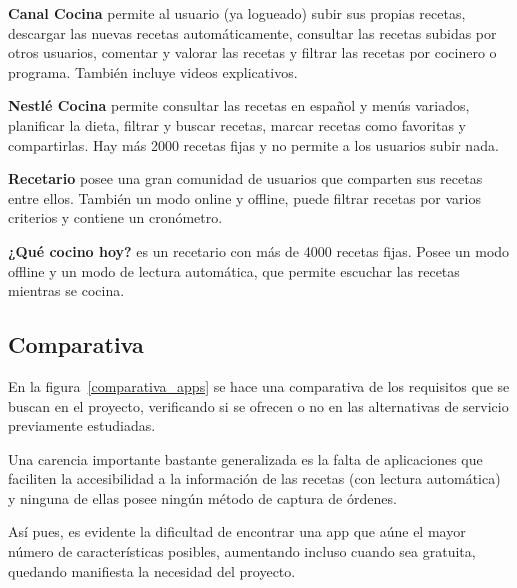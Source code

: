 \textbf{Canal Cocina} permite al usuario (ya logueado) subir sus propias
recetas, descargar las nuevas recetas automáticamente, consultar las recetas
subidas por otros usuarios, comentar y valorar las recetas y filtrar las
recetas por cocinero o programa. También incluye videos explicativos.

\textbf{Nestlé Cocina} permite consultar las recetas en español y menús variados,
planificar la dieta, filtrar y buscar recetas, marcar recetas como favoritas
y compartirlas. Hay más 2000 recetas fijas y no permite a los usuarios subir
nada.

\textbf{Recetario} posee una gran comunidad de usuarios que comparten sus
recetas entre ellos. También un modo online y offline, puede filtrar recetas
por varios criterios y contiene un cronómetro.

\textbf{¿Qué cocino hoy?} es un recetario con más de 4000 recetas fijas. Posee
un modo offline y un modo de lectura automática, que permite escuchar las recetas
mientras se cocina.

\subsection{Comparativa}

En la figura~\ref{comparativa_apps} se hace una comparativa de los requisitos
que se buscan en el proyecto, verificando si se ofrecen o no en las alternativas
de servicio previamente estudiadas.

Una carencia importante bastante generalizada es la falta de aplicaciones que
faciliten la accesibilidad a la información de las recetas (con lectura
automática) y ninguna de ellas posee ningún método de captura de órdenes.

Así pues, es evidente la dificultad de encontrar una app que aúne el mayor
número de características posibles, aumentando incluso cuando sea gratuita,
quedando manifiesta la necesidad del proyecto.


